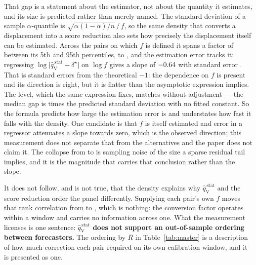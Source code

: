 \documentclass[preprint,11pt,authoryear]{elsarticle}
\newcommand{\1}{\boldsymbol{1}}
\newcommand{\qVstat}{\hat{q}_{\scriptscriptstyle\mathrm{V}}^{\,\mathrm{stat}}}
\begin{document}
That gap is a statement about the estimator, not about the quantity it estimates,
and its size is predicted rather than merely named. The standard deviation of a
sample $\alpha$-quantile is $\sqrt{\alpha(1-\alpha)/n}\,/\,f$, so the same
density that converts a displacement into a score reduction also sets how
precisely the displacement itself can be estimated. Across the \nMCBDensityPairs{}
pairs on which $f$ is defined it spans a factor of \nMCBDensitySpan{} between its
5th and 95th percentiles, \nMCBDensityLo{} to \nMCBDensityHi, and the estimation
error tracks it: regressing $\log\lvert\qVstat - \delta^\star\rvert$ on $\log f$
gives a slope of $-0.64$ with standard error \nMCBGapSlopeSE. That is
\nMCBGapSlopeSigma{} standard errors from the theoretical $-1$: the dependence
on $f$ is present and its direction is right, but it is flatter than the
asymptotic expression implies. The level, which the same expression fixes,
matches without adjustment --- the median gap is \nMCBGapMagRatio{} times the
predicted standard deviation with no fitted constant. So the formula predicts
how large the estimation error is and understates how fast it falls with the
density. One candidate is that $f$ is itself estimated and error in a regressor
attenuates a slope towards zero, which is the observed direction; this
measurement does not separate that from the alternatives and the paper does not
claim it. The collapse from \nMCBRhoCal{} to \nMCBRhoTest{} is sampling noise
of the size a sparse residual tail implies, and it is the magnitude that carries
that conclusion rather than the slope.

It does not follow, and is not true, that the density explains why $\qVstat$ and
the score reduction order the panel differently. Supplying each pair's own $f$
moves that rank correlation from \nMCBRhoPlain{} to \nMCBRhoConverted, which is
nothing: the conversion factor operates within a window and carries no
information across one. What the measurement licenses is one sentence:
\textbf{$\qVstat$ does not support an out-of-sample ordering between
forecasters.} The ordering by $\bar R$ in Table~\ref{tab:master} is a description
of how much correction each pair required on its own calibration window, and it
is presented as one.
\end{document}
